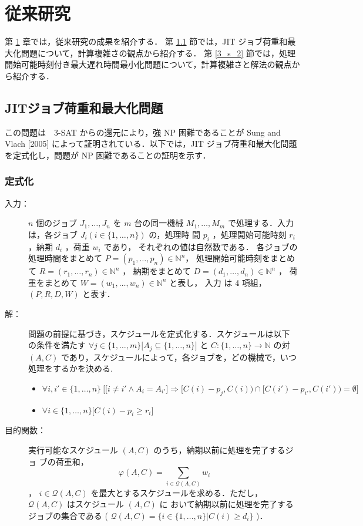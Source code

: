 \documentclass[12pt]{optlab-bachelor}
\begin{document}
\chapter{従来研究}\label{c_3}
第 \ref{c_3} 章では，従来研究の成果を紹介する．
第 \ref{3_s_1} 節では，JIT ジョブ荷重和最大化問題について，計算複雑さの観点から紹介する．
第 \ref{3_s_2} 節では，処理開始可能時刻付き最大遅れ時間最小化問題について，計算複雑さと解法の観点から紹介する．

\section{JITジョブ荷重和最大化問題}\label{3_s_1}
この問題は　\textsc{3-SAT} からの還元により，強 NP 困難であることが Sung and Vlach [2005] \cite{SJIT} によって証明されている．以下では，JIT ジョブ荷重和最大化問題を定式化し，問題が NP 困難であることの証明を示す．
\subsection{定式化}
\begin{description}
  \item[入力：] $n$ 個のジョブ $J_1,\ldots,J_n$ を $m$ 台の同一機械 $M_1,\ldots,M_m$
  で処理する．入力は，各ジョブ $J_i ( i \in \{1,\ldots,n\} )$ の，処理時
  間 $p_i$ ，処理開始可能時刻 $r_i$ ，納期 $d_i$ ，荷重 $w_i$ であり，
  それぞれの値は自然数である．
  各ジョブの処理時間をまとめて $P = (p_1,\ldots,p_n) \in \mathbb{N}^n$，
  処理開始可能時刻をまとめて $R = (r_1,\ldots,r_n) \in \mathbb{N}^n$ ，
  納期をまとめて $D = (d_1,\ldots,d_n) \in \mathbb{N}^n$ ，
  荷重をまとめて $W = (w_1,\ldots,w_n) \in \mathbb{N}^n$ と表し，
  入力 は 4 項組，$(P,R,D,W)$ と表す．
  \item[解：] 問題の前提に基づき，スケジュールを定式化する．スケジュールは以下
  の条件を満たす $\forall j \in \{1,\ldots,m\}\big[A_j \subseteq
  \{1,\ldots,n\}\big]$ と $C : \{1,\ldots,n\} \to \mathbb{N}$ の対 $(A,
  C)$ であり，スケジュールによって，各ジョブを，どの機械で，いつ処理をするかを決める.
  \begin{itemize}
    \item {\small $\forall i, i' \in \{1,\ldots,n\}\ \Big[ \big[i \neq i' \land A_i = A_{i'}\big] \Rightarrow [C(i) - p_j, C(i)) \cap [C(i') - p_{i'}, C(i')) = \emptyset \Big]$}
    \item  $\forall i \in \{1,\ldots,n\}\big[C(i) - p_i \ge r_i\big]$
  \end{itemize}
  \item[目的関数：] 実行可能なスケジュール $(A, C)$ のうち，納期以前に処理を完了するジョ
  ブの荷重和，
  $$\displaystyle \varphi(A,C) = \sum_{i \in \mathcal{Q}(A,C)}w_i$$，
  $i \in \mathcal{Q}(A,C)$ を最大とするスケジュールを求める．ただし，
  $\mathcal{Q}(A, C)$ はスケジュール $(A, C)$ に
  おいて納期以前に処理を完了するジョブの集合である (
  $\mathcal{Q}(A, C) = \{i \in \{1,\ldots, n\} | C(i) \ge d_i \}$ )．
\end{description}
\end{document}
